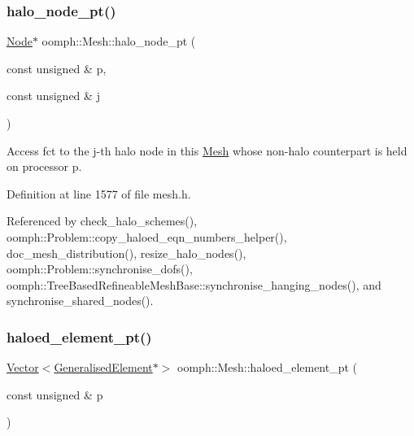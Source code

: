 \mbox{\label{classoomph_1_1Mesh_a011d1fb7981f6f54b2c4c224dbbca894}} 
\subsubsection{\texorpdfstring{halo\+\_\+node\+\_\+pt()}{halo\_node\_pt()}}
{\footnotesize\ttfamily \hyperlink{classoomph_1_1Node}{Node}$\ast$ oomph\+::\+Mesh\+::halo\+\_\+node\+\_\+pt (\begin{DoxyParamCaption}\item[{const unsigned \&}]{p,  }\item[{const unsigned \&}]{j }\end{DoxyParamCaption})\hspace{0.3cm}{\ttfamily [inline]}}



Access fct to the j-\/th halo node in this \hyperlink{classoomph_1_1Mesh}{Mesh} whose non-\/halo counterpart is held on processor p. 



Definition at line 1577 of file mesh.\+h.



Referenced by check\+\_\+halo\+\_\+schemes(), oomph\+::\+Problem\+::copy\+\_\+haloed\+\_\+eqn\+\_\+numbers\+\_\+helper(), doc\+\_\+mesh\+\_\+distribution(), resize\+\_\+halo\+\_\+nodes(), oomph\+::\+Problem\+::synchronise\+\_\+dofs(), oomph\+::\+Tree\+Based\+Refineable\+Mesh\+Base\+::synchronise\+\_\+hanging\+\_\+nodes(), and synchronise\+\_\+shared\+\_\+nodes().

\mbox{\label{classoomph_1_1Mesh_a56fea37302ae55a16402a9add625ad97}} 
\subsubsection{\texorpdfstring{haloed\+\_\+element\+\_\+pt()}{haloed\_element\_pt()}}
{\footnotesize\ttfamily \hyperlink{classoomph_1_1Vector}{Vector}$<$\hyperlink{classoomph_1_1GeneralisedElement}{Generalised\+Element}$\ast$$>$ oomph\+::\+Mesh\+::haloed\+\_\+element\+\_\+pt (\begin{DoxyParamCaption}\item[{const unsigned \&}]{p }\end{DoxyParamCaption})\hspace{0.3cm}{\ttfamily [inline]}}



